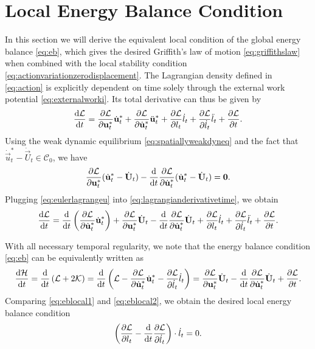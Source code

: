 \section{Local Energy Balance Condition} \label{sec:ebcalc}
In this section we will derive the equivalent local condition of the global energy balance \eqref{eq:eb}, which gives the desired Griffith's law of motion \eqref{eq:griffithslaw} when combined with the local stability condition \eqref{eq:actionvariationzerodisplacement}. The Lagrangian density defined in \eqref{eq:action} is explicitly dependent on time solely through the external work potential \eqref{eq:externalworki}. Its total derivative can thus be given by
\begin{equation} \label{eq:lagrangianderivativetime}
\frac{\md\mathcal{L}}{\md t}=\frac{\partial\mathcal{L}}{\partial\vec{u}_t^*}\dot{\vec{u}}_t^*+\frac{\partial\mathcal{L}}{\partial\dot{\vec{u}}_t^*}\ddot{\vec{u}}_t^*+\frac{\partial\mathcal{L}}{\partial l_t}\dot{l}_t+\frac{\partial\mathcal{L}}{\partial\dot{l}_t}\ddot{l}_t+\frac{\partial\mathcal{L}}{\partial t}.
\end{equation}
Using the weak dynamic equilibrium \eqref{eq:spatiallyweakdyneq} and the fact that $\dot{\vec{u}}_t^*-\dot{\vec{U}}_t\in\mathcal{C}_0$, we have
\begin{equation} \label{eq:eulerlagrangeu}
\frac{\partial\mathcal{L}}{\partial\vec{u}_t^*}(\dot{\vec{u}}_t^*-\dot{\vec{U}}_t)-\frac{\md}{\md t}\frac{\partial\mathcal{L}}{\partial\dot{\vec{u}}_t^*}(\dot{\vec{u}}_t^*-\dot{\vec{U}}_t)=\vec{0}.
\end{equation}
Plugging \eqref{eq:eulerlagrangeu} into \eqref{eq:lagrangianderivativetime}, we obtain
\begin{equation} \label{eq:eblocal1}
\frac{\md\mathcal{L}}{\md t}=\frac{\md}{\md t}\left(\frac{\partial\mathcal{L}}{\partial\dot{\vec{u}}_t^*}\dot{\vec{u}}_t^*\right)+\frac{\partial\mathcal{L}}{\partial\vec{u}_t^*}\dot{\vec{U}}_t-\frac{\md}{\md t}\frac{\partial\mathcal{L}}{\partial\dot{\vec{u}}_t^*}\dot{\vec{U}}_t+\frac{\partial\mathcal{L}}{\partial l_t}\dot{l}_t+\frac{\partial\mathcal{L}}{\partial\dot{l}_t}\ddot{l}_t+\frac{\partial\mathcal{L}}{\partial t}.
\end{equation}

With all necessary temporal regularity, we note that the energy balance condition \eqref{eq:eb} can be equivalently written as
\begin{equation} \label{eq:eblocal2}
\frac{\md\mathcal{H}}{\md t}=\frac{\md}{\md t}\left(\mathcal{L}+2\mathcal{K}\right)=\frac{\md}{\md t}\left(\mathcal{L}-\frac{\partial\mathcal{L}}{\partial\dot{\vec{u}}_t^*}\dot{\vec{u}}_t^*-\frac{\partial\mathcal{L}}{\partial\dot{l}_t}\dot{l}_t\right)=\frac{\partial\mathcal{L}}{\partial\vec{u}_t^*}\dot{\vec{U}}_t-\frac{\md}{\md t}\frac{\partial\mathcal{L}}{\partial\dot{\vec{u}}_t^*}\dot{\vec{U}}_t+\frac{\partial\mathcal{L}}{\partial t}.
\end{equation}
Comparing \eqref{eq:eblocal1} and \eqref{eq:eblocal2}, we obtain the desired local energy balance condition
\[
\left(\frac{\partial\mathcal{L}}{\partial l_t}-\frac{\mathrm{d}}{\mathrm{d} t}\frac{\partial\mathcal{L}}{\partial\dot{l}_t}\right)\cdot\dot{l}_t=0.
\]